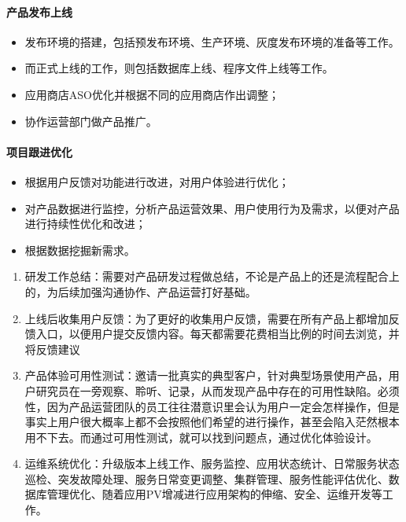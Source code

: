 \documentclass[letterpaper,11pt,english]{sphinxmanual}
\begin{document}
\paragraph{产品发布上线}
\label{\detokenize{chapter_project/process:id11}}\begin{itemize}
\item {} 
发布环境的搭建，包括预发布环境、生产环境、灰度发布环境的准备等工作。

\item {} 
而正式上线的工作，则包括数据库上线、程序文件上线等工作。

\item {} 
应用商店ASO优化并根据不同的应用商店作出调整；

\item {} 
协作运营部门做产品推广。

\end{itemize}


\paragraph{项目跟进优化}
\label{\detokenize{chapter_project/process:id12}}\begin{itemize}
\item {} 
根据用户反馈对功能进行改进，对用户体验进行优化；

\item {} 
对产品数据进行监控，分析产品运营效果、用户使用行为及需求，以便对产品进行持续性优化和改进；

\item {} 
根据数据挖掘新需求。

\end{itemize}
\begin{enumerate}
%
\item {} 
研发工作总结：需要对产品研发过程做总结，不论是产品上的还是流程配合上的，为后续加强沟通协作、产品运营打好基础。

\item {} 
上线后收集用户反馈：为了更好的收集用户反馈，需要在所有产品上都增加反馈入口，以便用户提交反馈内容。每天都需要花费相当比例的时间去浏览，并将反馈建议

\item {} 
产品体验可用性测试：邀请一批真实的典型客户，针对典型场景使用产品，用户研究员在一旁观察、聆听、记录，从而发现产品中存在的可用性缺陷。必须性，因为产品运营团队的员工往往潜意识里会认为用户一定会怎样操作，但是事实上用户很大概率上都不会按照他们希望的进行操作，甚至会陷入茫然根本用不下去。而通过可用性测试，就可以找到问题点，通过优化体验设计。

\item {} 
运维系统优化：升级版本上线工作、服务监控、应用状态统计、日常服务状态巡检、突发故障处理、服务日常变更调整、集群管理、服务性能评估优化、数据库管理优化、随着应用PV增减进行应用架构的伸缩、安全、运维开发等工作。

\end{enumerate}
\end{document}
